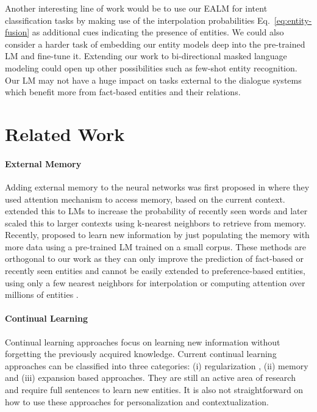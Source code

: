 \documentclass{article}
\begin{document}
Another interesting line of work would be to use our EALM for intent classification tasks by making use of the interpolation probabilities Eq.~\ref{eq:entity-fusion} as additional cues indicating the presence of entities. We could also consider a harder task of embedding our entity models deep into the pre-trained LM and fine-tune it. Extending our work to bi-directional masked language modeling \citep{devlin-etal-2019-bert} could open up other possibilities such as few-shot entity recognition. Our LM may not have a huge impact on tasks external \citep{NEURIPS2019_4496bf24} to the dialogue systems which benefit more from fact-based entities and their relations.

\section{Related Work}

\paragraph{External Memory} Adding external memory to the neural networks was first proposed in \citep{WestonCB14, NIPS2015_8fb21ee7} where they used attention mechanism \citep{BahdanauCB14} to access memory, based on the current context. \citep{MerityX0S17, GraveJU17} extended this to LMs to increase the probability of recently seen words and later \citep{GraveSecond} scaled this to larger contexts using k-nearest neighbors to retrieve from memory. Recently, \citep{Khandelwal} proposed to learn new information by just populating the memory with more data using a pre-trained LM trained on a small corpus. These methods are orthogonal to our work as they can only improve the prediction of fact-based or recently seen entities and cannot be easily extended to preference-based entities, using only a few nearest neighbors for interpolation or computing attention over millions of entities \citep{8639034}.  

\paragraph{Continual Learning} Continual learning approaches focus on learning new information without forgetting the previously acquired knowledge. Current continual learning approaches can be classified into three categories: (i) regularization \citep{Kirkpatrick3521, chaudhry}, (ii) memory \citep{ChaudhryRRE19, NEURIPS2019_f8d2e80c} and (iii) expansion \citep{rusu2016progressive, Schwarz0LGTPH18} based approaches. They are still an active area of research and require full sentences to learn new entities. It is also not straightforward on how to use these approaches for personalization and contextualization. 
\end{document}
